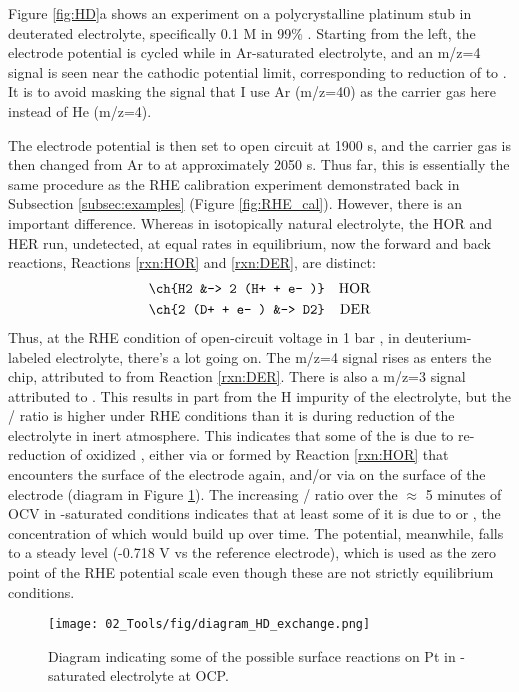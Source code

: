 Figure \ref{fig:HD}a shows an experiment on a polycrystalline platinum stub in deuterated electrolyte, specifically 0.1 M  in 99\% . Starting from the left, the electrode potential is cycled while in Ar-saturated electrolyte, and an m/z=4 signal is seen near the cathodic potential limit, corresponding to reduction of  to . It is to avoid masking the  signal that I use Ar (m/z=40) as the carrier gas here instead of He (m/z=4). 

The electrode potential is then set to open circuit at 1900 s, and the carrier gas is then changed from Ar to  at approximately 2050 s. Thus far, this is essentially the same procedure as the RHE calibration experiment demonstrated back in Subsection \ref{subsec:examples} (Figure \ref{fig:RHE_cal}). However, there is an important difference. Whereas in isotopically natural electrolyte, the HOR and HER run, undetected, at equal rates in equilibrium, now the forward and back reactions, Reactions \ref{rxn:HOR} and \ref{rxn:DER}, are distinct:
\begin{align}
\ch{H2 &-> 2 (H+ + e- )}&&\text{HOR}\label{rxn:HOR}\\
\ch{2 (D+ + e- ) &-> D2}&&\text{DER}\label{rxn:DER}
\end{align}
Thus, at the RHE condition of open-circuit voltage in 1 bar , in deuterium-labeled electrolyte, there's a lot going on. The m/z=4 signal rises as  enters the chip, attributed to  from Reaction \ref{rxn:DER}. There is also a m/z=3 signal attributed to . This  results in part from the H impurity of the electrolyte, but the / ratio is higher under RHE conditions than it is during reduction of the electrolyte in inert atmosphere. This indicates that some of the  is due to re-reduction of oxidized , either via  or  formed by Reaction \ref{rxn:HOR} that encounters the surface of the electrode again, and/or via  on the surface of the electrode (diagram in Figure \ref{fig:HD_diagram}). The increasing / ratio over the $\approx$ 5 minutes of OCV in -saturated conditions indicates that at least some of it is due to  or , the concentration of which would build up over time. The potential, meanwhile, falls to a steady level (-0.718 V vs the reference electrode), which is used as the zero point of the RHE potential scale even though these are not strictly equilibrium conditions.
\begin{figure}[h!]
	\centering
	\texttt{[image: 02\_Tools/fig/diagram\_HD\_exchange.png]}
	\caption{Diagram indicating some of the possible surface reactions on Pt in -saturated  electrolyte at OCP.}
	\label{fig:HD_diagram}
\end{figure}

